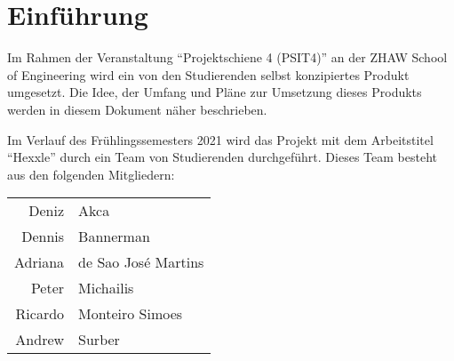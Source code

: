 \documentclass[../main.tex]{subfiles}
\begin{document}
	\section{Einführung}
	\par Im Rahmen der Veranstaltung \enquote{Projektschiene 4 (PSIT4)} an der ZHAW School of Engineering wird ein von den Studierenden selbst konzipiertes Produkt umgesetzt. Die Idee, der Umfang und Pläne zur Umsetzung dieses Produkts werden in diesem Dokument näher beschrieben.
	\par Im Verlauf des Frühlingssemesters 2021 wird das Projekt mit dem Arbeitstitel \enquote{Hexxle}  durch ein Team von Studierenden durchgeführt. Dieses Team besteht aus den folgenden Mitgliedern:
	\begin{table}[H]
		\centering
		\begin{tabular}{rl}
			Deniz   & Akca                \\
			Dennis  & Bannerman           \\
			Adriana & de Sao José Martins \\
			Peter   & Michailis           \\
			Ricardo & Monteiro Simoes     \\
			Andrew  & Surber             
		\end{tabular}
	\end{table}
	
\end{document}
